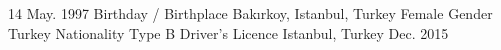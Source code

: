 


\begin{cventries}


\cventry
{14 May. 1997} %
{Birthday / Birthplace} %
{Bakırkoy, Istanbul, Turkey} %
{} %
{}%
\cventry
{Female} %
{Gender} %
{} %
{} %
{}%
\cventry
{Turkey} %
{Nationality} %
{} %
{} %
{} %
\cventry
{Type B} %
{Driver's Licence} %
{Istanbul, Turkey} %
{Dec. 2015} %
{} %

\end{cventries}